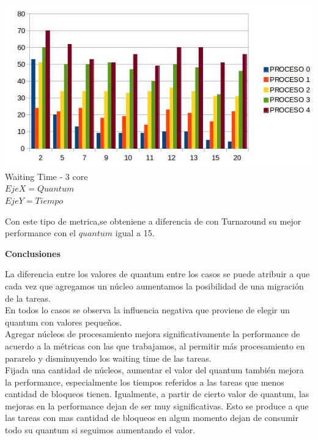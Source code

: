   \begin{center}
    	\includegraphics[width=1\textwidth]{./EJ7/waintin3core.jpg}
	{Waiting Time - 3 core}	\\
	{$Eje X = Quantum $\\$Eje Y = Tiempo$}\\
 \end{center} 
 
   \indent Con este tipo de metrica,se obteniene a diferencia de con Turnaround  su mejor
   performance con el $quantum$ igual a 15.\\
  
 \begin{center}
  \textbf{Conclusiones}
 \end{center}


\indent \indent La diferencia entre los valores de quantum entre los casos se puede atribuir a que cada vez que 
agregamos un núcleo aumentamos la posibilidad de una migración de la tareas.\\
\indent \indent En todos lo casos se observa la influencia negativa que proviene de elegir un quantum con valores pequeños.\\
\indent \indent Agregar núcleos de procesamiento mejora significativamente la performance de acuerdo a la métricas con las que
trabajamos, al permitir más procesamiento en pararelo y disminuyendo los waiting time de las tareas.\\
\indent \indent  Fijada una cantidad de núcleos, aumentar el valor del quantum también mejora la performance, 
especialmente los tiempos referidos a las tareas que menos cantidad de bloqueos tienen. 
Igualmente, a partir de cierto valor de quantum, las mejoras en la performance dejan de ser muy significativas. 
Esto se produce a que las tareas con mas cantidad de bloqueos en algun momento dejan de consumir todo
su quantum si seguimos aumentando el valor. 
 
